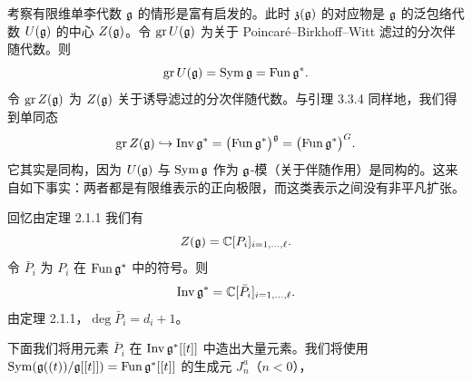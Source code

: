 考察有限维单李代数 $\mathfrak{g}$ 的情形是富有启发的。此时 $\mathfrak z(\mathfrak{g})$ 的对应物是 $\mathfrak{g}$ 的泛包络代数 $U(\mathfrak{g})$ 的中心 $Z(\mathfrak{g})$。令 $\operatorname{gr}U(\mathfrak{g})$ 为关于 Poincaré--Birkhoff--Witt 滤过的分次伴随代数。则
\[
    \operatorname{gr}U(\mathfrak{g}) = \operatorname{Sym}\mathfrak{g} = \operatorname{Fun}\mathfrak{g}^*.
\]
令 $\operatorname{gr}Z(\mathfrak{g})$ 为 $Z(\mathfrak{g})$ 关于诱导滤过的分次伴随代数。与引理 3.3.4 同样地，我们得到单同态
\[
    \operatorname{gr}Z(\mathfrak{g}) \hookrightarrow \operatorname{Inv}\mathfrak{g}^*
    = \bigl(\operatorname{Fun}\mathfrak{g}^*\bigr)^{\mathfrak{g}}
    = \bigl(\operatorname{Fun}\mathfrak{g}^*\bigr)^{G}.
\]
它其实是同构，因为 $U(\mathfrak{g})$ 与 $\operatorname{Sym}\mathfrak{g}$ 作为 $\mathfrak{g}$-模（关于伴随作用）是同构的。这来自如下事实：两者都是有限维表示的正向极限，而这类表示之间没有非平凡扩张。

回忆由定理 2.1.1 我们有
\[
    Z(\mathfrak{g}) = \mathbb{C}[P_i]_{i=1,\dots,\ell}.
\]
令 $\bar P_i$ 为 $P_i$ 在 $\operatorname{Fun}\mathfrak{g}^*$ 中的符号。则
\[
    \operatorname{Inv}\mathfrak{g}^* = \mathbb{C}[\bar P_i]_{i=1,\dots,\ell}.
\]
由定理 2.1.1，$\deg\bar P_i=d_i+1$。


下面我们将用元素 $\bar P_i$ 在 $\operatorname{Inv}\mathfrak{g}^*[[t]]$ 中造出大量元素。我们将使用 $\operatorname{Sym}(\mathfrak{g}((t))/\mathfrak{g}[[t]])=\operatorname{Fun}\mathfrak{g}^*[[t]]$ 的生成元 $J^a_n$（$n<0$），

